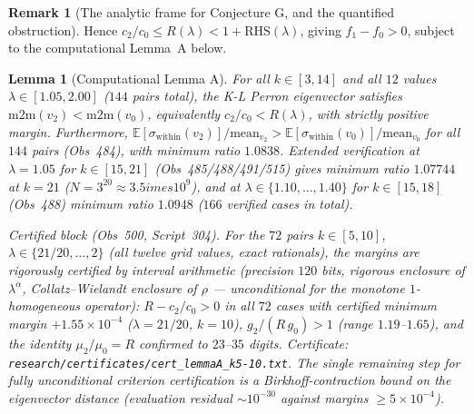 \documentclass[11pt]{article}
\newtheorem{lemma}[theorem]{Lemma}
\theoremstyle{definition}
\newtheorem{remark}[theorem]{Remark}
\begin{document}
\begin{remark}[The analytic frame for Conjecture G, and the quantified
obstruction]
Hence $c_2/c_0 \le R(\lambda) < 1 + \mathrm{RHS}(\lambda)$, giving $f_1-f_0>0$,
subject to the computational Lemma~A below.

\begin{lemma}[Computational Lemma A]\label{lem:m2m}
For all $k \in [3,14]$ and all $12$ values $\lambda \in [1.05, 2.00]$ ($144$ pairs total),
the K-L Perron eigenvector satisfies
$\mathrm{m2m}(v_2) < \mathrm{m2m}(v_0)$, equivalently $c_2/c_0 < R(\lambda)$,
with strictly positive margin. Furthermore,
$\mathbb{E}[\sigma_{\mathrm{within}}(v_2)]/\mathrm{mean}_{v_2} > \mathbb{E}[\sigma_{\mathrm{within}}(v_0)]/\mathrm{mean}_{v_0}$
for all $144$ pairs (Obs~484), with minimum ratio $1.0838$.
Extended verification at $\lambda=1.05$ for $k\in[15,21]$ (Obs~485/488/491/515) gives minimum ratio
$1.07744$ at $k=21$ ($N=3^{20}\approx 3.5	imes 10^9$), and at $\lambda\in\{1.10,\ldots,1.40\}$ for $k\in[15,18]$ (Obs~488)
minimum ratio $1.0948$ ($166$ verified cases in total).

\emph{Certified block (Obs~500, Script~304).} For the $72$ pairs $k\in[5,10]$,
$\lambda\in\{21/20,\ldots,2\}$ (all twelve grid values, exact rationals), the margins are
\emph{rigorously certified} by interval arithmetic (precision $120$ bits, rigorous
enclosure of $\lambda^{\alpha}$, Collatz--Wielandt enclosure of $\rho$ --- unconditional
for the monotone $1$-homogeneous operator): $R - c_2/c_0 > 0$ in all $72$ cases with
certified minimum margin $+1.55\times 10^{-4}$ ($\lambda=21/20$, $k=10$), $g_2/(R\,g_0) > 1$
(range $1.19$--$1.65$), and the identity $\mu_2/\mu_0 = R$ confirmed to $23$--$35$ digits.
Certificate: \texttt{research/certificates/cert\_lemmaA\_k5-10.txt}. The single remaining
step for fully unconditional criterion certification is a Birkhoff-contraction bound on
the eigenvector distance (evaluation residual $\sim 10^{-30}$ against margins
$\ge 5\times 10^{-4}$).
\end{lemma}


\end{remark}
\end{document}
